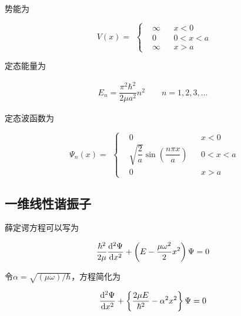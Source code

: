 势能为

\begin{equation*}
  \begin{aligned}
    V \left( x \right) =
  \end{aligned}
  \left\{
  \begin{aligned}
    &\infty&&x<0 \\
    &0&&0<x<a \\
    &\infty&&x>a
  \end{aligned}
  \right.
\end{equation*}

定态能量为

\begin{equation*}
  \begin{aligned}
    E_n = \dfrac{\pi^2 \hbar^2}{2 \mu a^2} n^2 \quad\quad n = 1,2,3,\dots 
  \end{aligned}
\end{equation*}

定态波函数为

\begin{equation*}
  \begin{aligned}
    \Psi_n \left( x \right) =
  \end{aligned}
  \left\{
  \begin{aligned}
    & 0 && x<0 \\
    & \sqrt{\dfrac{2}{a} } \sin \left( \dfrac{n \pi x}{a}  \right) && 0<x<a \\
    & 0  && x>a
  \end{aligned}
  \right.
\end{equation*}

\subsection{一维线性谐振子}

薛定谔方程可以写为

\begin{equation*}
  \begin{aligned}
    \dfrac{\hbar^2}{2 \mu} \dfrac{\mathop{}\!\mathrm{d}^2 \Psi}{\mathop{}\!\mathrm{d} x^2}  + \left( E - \dfrac{\mu \omega^2}{2} x^2  \right) \Psi = 0  
  \end{aligned}
\end{equation*}

令$\alpha = \sqrt{\left( \mu \omega \right)/\hbar}$，方程简化为

\begin{equation*}
  \begin{aligned}
    \dfrac{\mathop{}\!\mathrm{d}^2 \Psi}{\mathop{}\!\mathrm{d} x^2}  + \left\{ \dfrac{2 \mu E}{\hbar^2} - \alpha^2 x^2  \right\} \Psi = 0
  \end{aligned}
\end{equation*}

